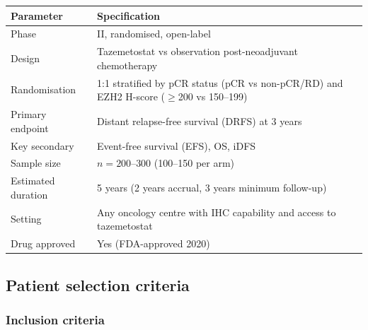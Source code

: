 \documentclass[12pt, a4paper]{article}
\begin{document}
\begin{center}
\begin{tabular}{ll}
\toprule
\textbf{Parameter} & \textbf{Specification} \\
\midrule
Phase & II, randomised, open-label \\
Design & Tazemetostat vs observation
         post-neoadjuvant chemotherapy \\
Randomisation & 1:1 stratified by pCR status
                (pCR vs non-pCR/RD) and
                EZH2 H-score ($\geq$200 vs
                150--199) \\
Primary endpoint & Distant relapse-free survival
                   (DRFS) at 3 years \\
Key secondary & Event-free survival (EFS),
                OS, iDFS \\
Sample size & $n = 200$--$300$
              (100--150 per arm) \\
Estimated duration & 5 years (2 years accrual,
                     3 years minimum follow-up) \\
Setting & Any oncology centre with IHC
          capability and access to
          tazemetostat \\
Drug approved & Yes (FDA-approved 2020) \\
\bottomrule
\end{tabular}
\end{center}

\subsection{Patient selection criteria}

\subsubsection{Inclusion criteria}
\end{document}
